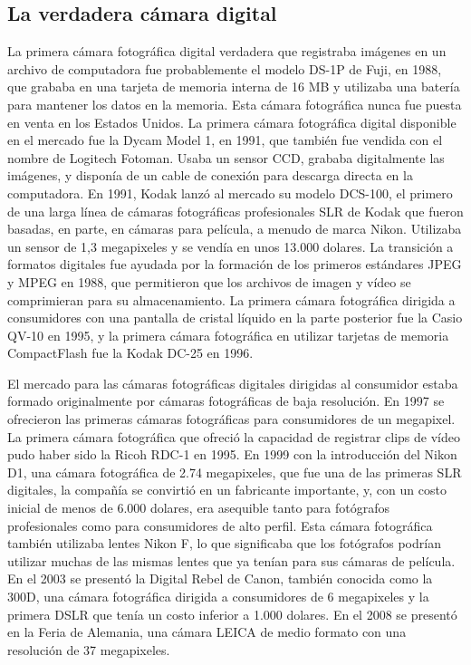 \documentclass[12pt,a4paper]{report}
\begin{document}
\subsection{La verdadera cámara digital }
La primera cámara fotográfica digital verdadera que registraba imágenes en un
archivo de computadora fue probablemente el modelo DS-1P de Fuji, en 1988, que
grababa en una tarjeta de memoria interna de 16 MB y utilizaba una batería para
mantener los datos en la memoria. Esta cámara fotográfica nunca fue puesta en
venta en los Estados Unidos. La primera cámara fotográfica digital disponible en
el mercado fue la Dycam Model 1, en 1991, que también fue vendida con el nombre
de Logitech Fotoman. Usaba un sensor CCD, grababa digitalmente las imágenes, y
disponía de un cable de conexión para descarga directa en la computadora.
En 1991, Kodak lanzó al mercado su modelo DCS-100, el primero de una larga línea
de cámaras fotográficas profesionales SLR de Kodak que fueron basadas, en parte,
en cámaras para película, a menudo de marca Nikon. Utilizaba un sensor de 1,3
megapixeles y se vendía en unos 13.000 dolares.
La transición a formatos digitales fue ayudada por la formación de los primeros
estándares JPEG y MPEG en 1988, que permitieron que los archivos de imagen y
vídeo se comprimieran para su almacenamiento. La primera cámara fotográfica
dirigida a consumidores con una pantalla de cristal líquido en la parte
posterior fue la Casio QV-10 en 1995, y la primera cámara fotográfica en
utilizar tarjetas de memoria CompactFlash fue la Kodak DC-25 en 1996.

El mercado para las cámaras fotográficas digitales dirigidas al consumidor
estaba formado originalmente por cámaras fotográficas de baja resolución. En
1997 se ofrecieron las primeras cámaras fotográficas para consumidores de un
megapixel. La primera cámara fotográfica que ofreció la capacidad de registrar
clips de vídeo pudo haber sido la Ricoh RDC-1 en 1995.
En 1999 con la introducción del Nikon D1, una cámara fotográfica de 2.74
megapixeles, que fue una de las primeras SLR digitales, la compañía se convirtió
en un fabricante importante, y, con un costo inicial de menos de 6.000 dolares,
era asequible tanto para fotógrafos profesionales como para consumidores de alto
perfil. Esta cámara fotográfica también utilizaba lentes Nikon F, lo que
significaba que los fotógrafos podrían utilizar muchas de las mismas lentes que
ya tenían para sus cámaras de película.
En el 2003 se presentó la Digital Rebel de Canon, también conocida como la 300D,
una cámara fotográfica dirigida a consumidores de 6 megapixeles y la primera
DSLR que tenía un costo inferior a 1.000 dolares.
En el 2008 se presentó en la Feria de Alemania, una cámara LEICA de medio
formato con una resolución de 37 megapixeles.
\end{document}
